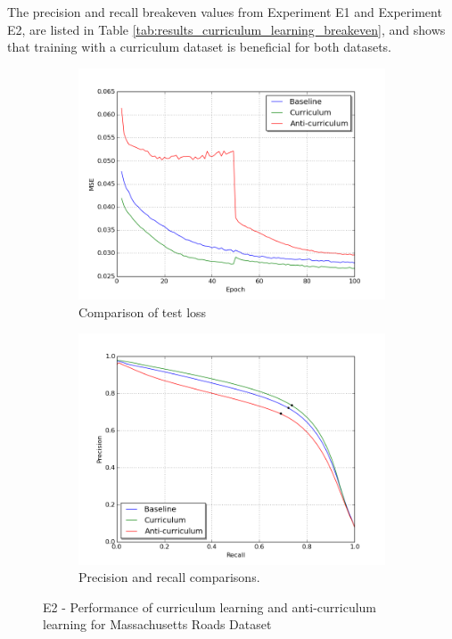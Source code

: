 The precision and recall breakeven values from Experiment E1 and Experiment E2, are listed in Table \ref{tab:results_curriculum_learning_breakeven}, and shows that training with a curriculum dataset is beneficial for both datasets.\\
\begin{figure}[!ht]
\begin{subfigure}{0.48\textwidth}
\includegraphics[width=\linewidth]{figs/E2/E2-lc.png}
\caption{Comparison of test loss} \label{fig:E2_curr_mass_loss}
\end{subfigure}
\hspace*{\fill} %
\begin{subfigure}{0.48\textwidth}
\includegraphics[width=\linewidth]{figs/E2/E2-pr.png}
\caption{Precision and recall comparisons.} \label{fig:E2_curr_mass_pr}
\end{subfigure}
\hspace*{\fill} %
\caption{E2 - Performance of curriculum learning and anti-curriculum learning for Massachusetts Roads Dataset} \label{fig:E2_curriculum_mass}
\end{figure}

